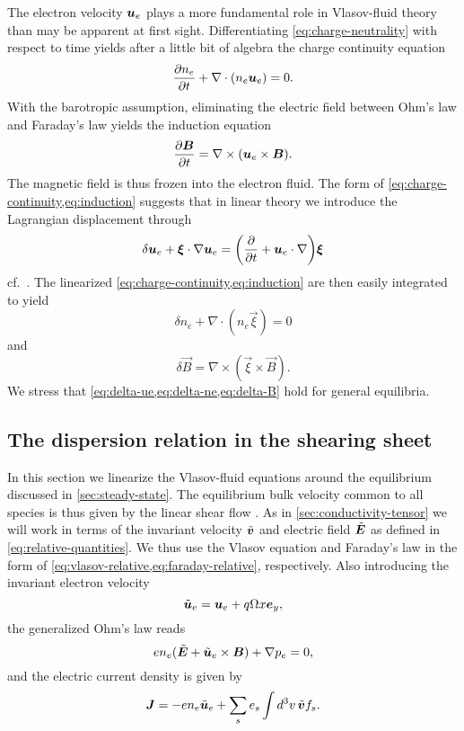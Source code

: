 \documentclass[aps,pre,notitlepage,amsmath,amssymb,amsfonts,nobibnotes,nofootinbib,superscriptaddress]{revtex4-1}
\begin{document}
The electron velocity $\bm{u}_e$ plays a more fundamental role in Vlasov-fluid
theory than may be apparent at first sight. Differentiating
\cref{eq:charge-neutrality} with respect to time yields after a little bit of
algebra the charge continuity equation
\begin{equation}
  \label{eq:charge-continuity}
  \pder{n_e}{t} + \nabla\cdot(n_e\vec{u}_e) = 0.
\end{equation}
With the barotropic assumption, eliminating the electric field between Ohm's
law and Faraday's law yields the induction equation
\begin{equation}
  \label{eq:induction}
  \pder{\vec{B}}{t} = \nabla\times(\vec{u}_e\times\vec{B}).
\end{equation}
The magnetic field is thus frozen into the electron fluid. The form of
\cref{eq:charge-continuity,eq:induction} suggests that in linear theory we
introduce the Lagrangian displacement through
\begin{equation}
  \label{eq:delta-ue}
  \delta\ue + \vec{\xi}\cdot\nabla\ue =
  \left(\pder{}{t} + \ue\cdot\nabla\right)\vec{\xi}
\end{equation}
cf.\ \citet{Lynden-Bell1967,Friedman1978}. The linearized
\cref{eq:charge-continuity,eq:induction} are then easily integrated to yield
\begin{equation}
  \label{eq:delta-ne}
  \delta n_e + \nabla\cdot(n_e\vec{\xi}) = 0
\end{equation}
and
\begin{equation}
  \label{eq:delta-B}
  \delta\vec{B} = \nabla\times(\vec{\xi}\times\vec{B}).
\end{equation}
We stress that \cref{eq:delta-ue,eq:delta-ne,eq:delta-B} hold for general
equilibria.

\subsection{The dispersion relation in the shearing sheet}

In this section we linearize the Vlasov-fluid equations around the equilibrium
discussed in \cref{sec:steady-state}. The equilibrium bulk velocity common to
all species is thus given by the linear shear flow .
As in \cref{sec:conductivity-tensor} we will work in terms of the invariant
velocity $\tilde{\bm{v}}$ and electric field $\tilde{\bm{E}}$ as defined in
\cref{eq:relative-quantities}. We thus use the Vlasov equation and Faraday's
law in the form of \cref{eq:vlasov-relative,eq:faraday-relative},
respectively. Also introducing the invariant electron velocity
\begin{equation}
  \tilde{\bm{u}}_e = \bm{u}_e + q\Omega x\bm{e}_y,
\end{equation}
the generalized Ohm's law reads
\begin{equation}
  \label{eq:ohms-law-relative}
  e n_e(\tvec{E} + \tue\times\vec{B}) + \nabla\pe = 0,
\end{equation}
and the electric current density is given by
\begin{equation}
  \label{eq:ampere-relative}
  \vec{J} = -en_e\tilde{\vec{u}}_e + \sums \qs\int d^3v\,\tvec{v} f_s.
\end{equation}
\end{document}
